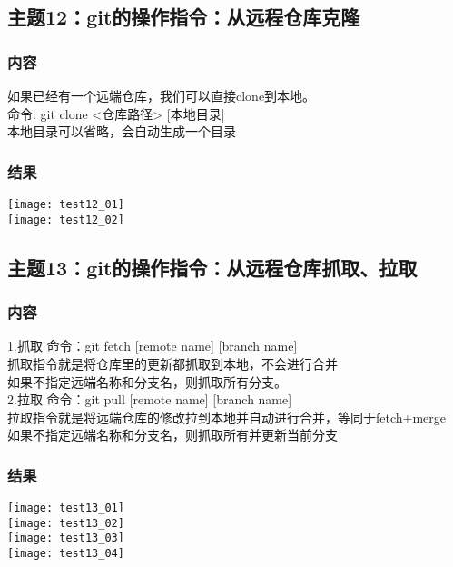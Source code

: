 \documentclass{article}
\begin{document}
\subsection{主题12：git的操作指令：从远程仓库克隆}  
\subsubsection{内容}
如果已经有一个远端仓库，我们可以直接clone到本地。\\
命令: git clone <仓库路径> [本地目录]\\
本地目录可以省略，会自动生成一个目录\\
\subsubsection{结果}  
\texttt{[image: test12\_01]}\\
\texttt{[image: test12\_02]}\\
\vspace{1cm}
\subsection{主题13：git的操作指令：从远程仓库抓取、拉取}  
\subsubsection{内容}
1.抓取 命令：git fetch [remote name] [branch name]\\
抓取指令就是将仓库里的更新都抓取到本地，不会进行合并\\
如果不指定远端名称和分支名，则抓取所有分支。\\
2.拉取 命令：git pull [remote name] [branch name]\\
拉取指令就是将远端仓库的修改拉到本地并自动进行合并，等同于fetch+merge\\
如果不指定远端名称和分支名，则抓取所有并更新当前分支\\
\subsubsection{结果}  
\texttt{[image: test13\_01]}\\
\texttt{[image: test13\_02]}\\
\texttt{[image: test13\_03]}\\
\texttt{[image: test13\_04]}\\
\vspace{1cm}
\end{document}
